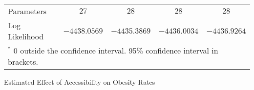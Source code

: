 \begin{table*}
\begin{center}
{\begin{tabular}{l c c c c}
Parameters                          & $27$                   & $28$                   & $28$                   & $28$                   \\
Log Likelihood                      & $-4438.0569$           & $-4435.3869$           & $-4436.0034$           & $-4436.9264$           \\
\bottomrule
\multicolumn{5}{l}{\scriptsize{$^*$ 0 outside the confidence interval. 95\% confidence interval in brackets.}}
\end{tabular}
}\end{center}
\end{table*}

\begin{table*}
  \caption{\label{tab:ob-fullmodels} Estimated Effect of Accessibility on Obesity Rates}
  \begin{center}
  \scalebox{0.7}{

}
\end{center}
\end{table*}
